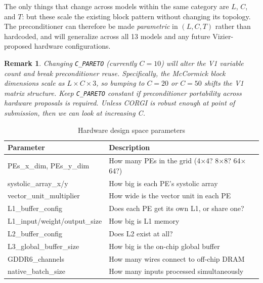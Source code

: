 \documentclass{article}
\newtheorem*{remark}{Remark}
\begin{document}
The only things that change across models within the same category are
$L$, $C$, and $T$: but these scale the existing block pattern without
changing its topology.
The preconditioner can therefore be made \emph{parametric} in $(L, C, T)$
rather than hardcoded, and will generalize across all 13 models and any
future Vizier-proposed hardware configurations.

\begin{remark}
    Changing \texttt{C\_PARETO} (currently $C = 10$) will alter the V1
    variable count and break preconditioner reuse.
    Specifically, the McCormick block dimensions scale as $L \times C \times 3$,
    so bumping to $C = 20$ or $C = 50$ shifts the V1 matrix structure.
    Keep \texttt{C\_PARETO} constant if preconditioner portability across
    hardware proposals is required. Unless CORGI is robust enough at point of submission, then we can look at increasing C. 
\end{remark}

\begin{table}[h!]
\centering
\begin{tabular}{>{\ttfamily}l p{8cm}}
\toprule
\normalfont\textbf{Parameter} & \textbf{Description} \\
\midrule
PEs\_x\_dim, PEs\_y\_dim        & How many PEs in the grid (4$\times$4? 8$\times$8? 64$\times$64?) \\[4pt]
systolic\_array\_x/y            & How big is each PE's systolic array \\[4pt]
vector\_unit\_multiplier        & How wide is the vector unit in each PE \\[4pt]
L1\_buffer\_config              & Does each PE get its own L1, or share one? \\[4pt]
L1\_input/weight/output\_size   & How big is L1 memory \\[4pt]
L2\_buffer\_config              & Does L2 exist at all? \\[4pt]
L3\_global\_buffer\_size        & How big is the on-chip global buffer \\[4pt]
GDDR6\_channels                 & How many wires connect to off-chip DRAM \\[4pt]
native\_batch\_size             & How many inputs processed simultaneously \\
\bottomrule
\end{tabular}
\caption{Hardware design space parameters}
\end{table}

\bigskip
\end{document}
